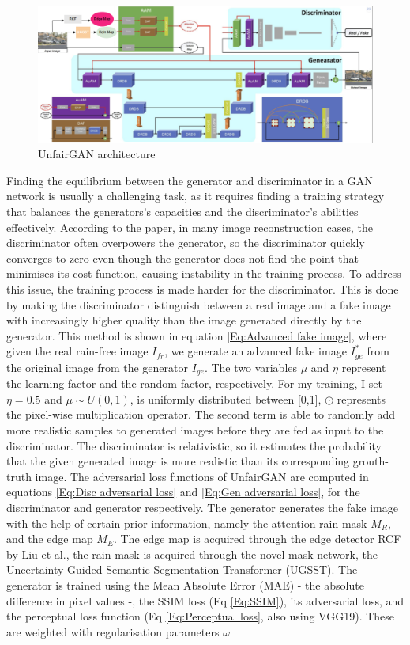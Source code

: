 \documentclass[11pt]{ociamthesis}  %
\begin{document}
\begin{figure}
    \centering
    \includegraphics[width=1\linewidth]{UnFairGAN.png}
    \caption{UnfairGAN architecture}
    \label{fig:UnfairGAN architecture}
\end{figure}

Finding the equilibrium between the generator and discriminator in a GAN network is usually a challenging task, as it requires finding a training strategy that balances the generators's capacities and the discriminator's abilities effectively. According to the paper, in many image reconstruction cases, the discriminator often overpowers the generator, so the discriminator quickly converges to zero even though the generator does not find the point that minimises its cost function, causing instability in the training process. To address this issue, the training process is made harder for the discriminator. This is done by making the discriminator distinguish between a real image and a fake image with increasingly higher quality than the image generated directly by the generator. This method is shown in equation \ref{Eq:Advanced fake image}, where given the real rain-free image $I_{fr}$, we generate an advanced fake image $I^*_{ge}$ from the original image from the generator $I_{ge}$. The two variables $\mu$ and $\eta$ represent the learning factor and the random factor, respectively. For my training, I set $\eta = 0.5$ and $\mu \sim U(0,1)$, is uniformly distributed between [0,1], $\odot$ represents the pixel-wise multiplication operator. The second term is able to randomly add more realistic samples to generated images before they are fed as input to the discriminator. The discriminator is relativistic, so it estimates the probability that the given generated image is more realistic than its corresponding grouth-truth image\cite{jolicoeurmartineau2018relativisticdiscriminatorkeyelement}. The adversarial loss functions of UnfairGAN are computed in equations \ref{Eq:Disc adversarial loss} and \ref{Eq:Gen adversarial loss}, for the discriminator and generator respectively. The generator generates the fake image with the help of certain prior information, namely the attention rain mask $M_R$, and the edge map $M_E$. The edge map is acquired through the edge detector RCF by Liu et al.\cite{liu2017richer}, the rain mask is acquired through the novel mask network, the Uncertainty Guided Semantic Segmentation Transformer (UGSST). The generator is trained using the Mean Absolute Error (MAE) - the absolute difference in pixel values -, the SSIM loss (Eq \ref{Eq:SSIM}), its adversarial loss, and the perceptual loss function (Eq \ref{Eq:Perceptual loss}, also using VGG19\cite{simonyan2014vgg}). These are weighted with regularisation parameters $\omega$ 
\end{document}
